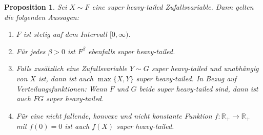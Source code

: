 \documentclass[
12pt,
fancyheadings, %
%
a4paper, 
%
]{tuhhreprt}
\newtheorem{proposition}[definition]{Proposition}
\begin{document}
\begin{proposition} \cite[Proposition 2.]{ChenShneer2024}
Sei \( X \sim F \) eine \emph{super heavy-tailed} Zufallsvariable. Dann gelten die folgenden Aussagen:
\begin{enumerate}[label=\roman*)]
    \item \( F \) ist stetig auf dem Intervall \( [0, \infty) \).
    \item Für jedes \( \beta > 0 \) ist \( F^\beta \) ebenfalls \emph{super heavy-tailed}.
    \item Falls zusätzlich eine Zufallsvariable \( Y \sim G \) \emph{super heavy-tailed} und unabhängig von \( X \) ist, dann ist auch \( \max\{X, Y\} \) \emph{super heavy-tailed}. In Bezug auf Verteilungsfunktionen: Wenn \( F \) und \( G \) beide \emph{super heavy-tailed} sind, dann ist auch \( FG \) \emph{super heavy-tailed}.
    \item Für eine nicht fallende, konvexe und nicht konstante Funktion \( f : \mathbb{R}_+ \to \mathbb{R}_+ \) mit \( f(0) = 0 \) ist auch \( f(X) \) \emph{super heavy-tailed}.
\end{enumerate}
\end{proposition}
\end{document}
